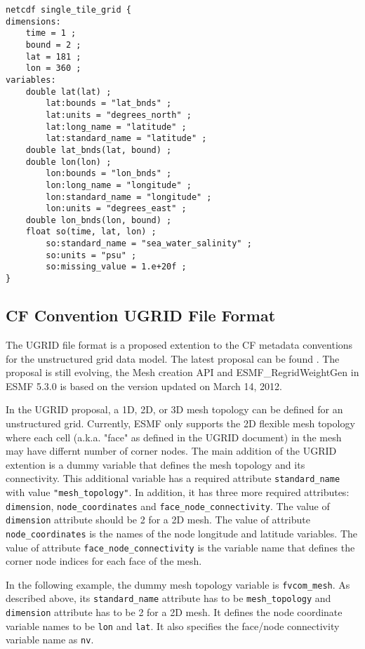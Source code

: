 \begin{verbatim}
netcdf single_tile_grid {
dimensions:
	time = 1 ;
	bound = 2 ;
	lat = 181 ;
	lon = 360 ;
variables:
	double lat(lat) ;
		lat:bounds = "lat_bnds" ;
		lat:units = "degrees_north" ;
		lat:long_name = "latitude" ;
		lat:standard_name = "latitude" ;
	double lat_bnds(lat, bound) ;
	double lon(lon) ;
		lon:bounds = "lon_bnds" ;
		lon:long_name = "longitude" ;
		lon:standard_name = "longitude" ;
		lon:units = "degrees_east" ;
	double lon_bnds(lon, bound) ;
	float so(time, lat, lon) ;
		so:standard_name = "sea_water_salinity" ;
		so:units = "psu" ;
		so:missing_value = 1.e+20f ;
}
\end{verbatim}

\subsection{CF Convention UGRID File Format}\label{sec:fileformat:ugrid}

The UGRID file format is a proposed extention to the CF metadata conventions for the unstructured grid data model. The latest proposal can be found .  The proposal is still evolving, 
the Mesh creation API and ESMF\_RegridWeightGen in ESMF 5.3.0 is based on the version updated on March 14, 2012.

In the UGRID proposal, a 1D, 2D, or 3D mesh topology can be defined for an unstructured grid.  Currently, ESMF 
only supports the 2D flexible mesh topology where each cell (a.k.a. "face" as defined in the UGRID document)  
in the mesh may have 
differnt number of corner nodes.  The main addition of the UGRID extention is a dummy variable that defines the mesh 
topology and its connectivity.  This additional variable has a required attribute {\tt standard\_name} with value {\tt "mesh\_topology"}.  In addition, it has three more required attributes: {\tt dimension}, {\tt node\_coordinates} and 
{\tt face\_node\_connectivity}.  The value of {\tt dimension} attribute should be 2 for a 2D mesh.  The 
value of attribute {\tt node\_coordinates} is the names of the node longitude and latitude variables.
The value of attribute {\tt face\_node\_connectivity} is the variable name that defines the corner node indices for each face of the mesh.   

In the following example, the dummy mesh topology variable is {\tt fvcom\_mesh}.  As described above, its {\tt standard\_name} attribute has to be {\tt mesh\_topology} and {\tt dimension} attribute has to be 2 for a 2D mesh.  It defines 
the node coordinate variable names to be {\tt lon} and {\tt lat}.  It also specifies the face/node connectivity variable name as {\tt nv}.

